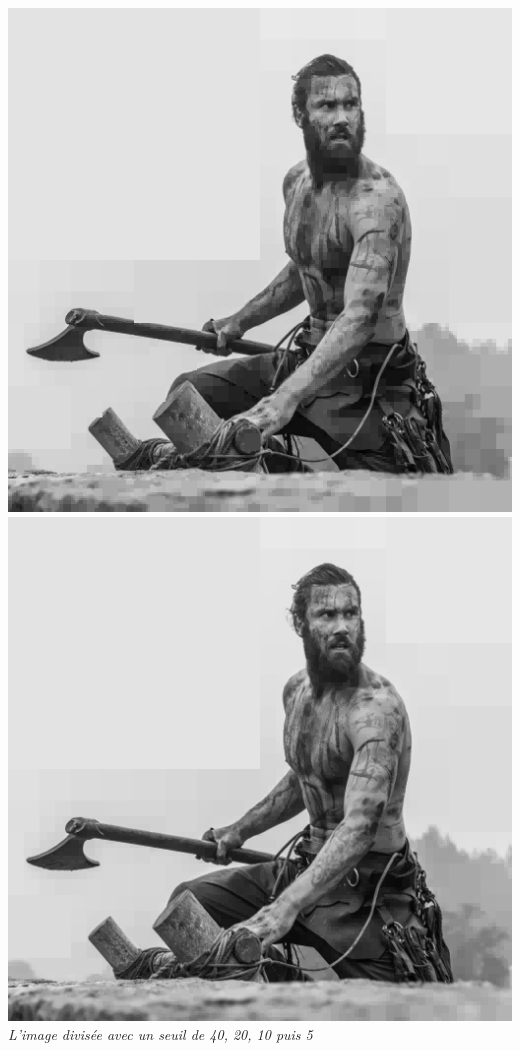 \documentclass[a4paper,11pt]{article}
\begin{document}
\begin{center}
\includegraphics[scale=0.33]{rolloRec10.png}
\includegraphics[scale=0.33]{rolloRec05.png}\\
\textit{L'image divisée avec un seuil de 40, 20, 10 puis 5}
\end{center}
\end{document}

